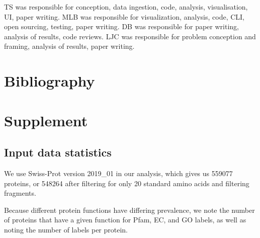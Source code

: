 \begin{contributions}
  TS was responsible for conception, data ingestion, code, analysis, visualisation, UI, paper writing. MLB was
  responsible for visualization, analysis, code, CLI, open sourcing, testing, paper writing. DB was responsible for
  paper writing, analysis of results, code reviews. LJC was responsible for problem conception and framing, analysis of results, paper writing.
\end{contributions}

  
  \section*{Bibliography}


\onecolumn
\newpage

\section*{Supplement}
\beginsupplement


\subsection{Input data statistics}

We use Swiss-Prot version 2019\_01 in our analysis, which gives us 559077 proteins, or 548264 after filtering for only 20 standard amino acids and filtering fragments.

Because different protein functions have differing prevalence, we note the number of proteins that have a given function for Pfam, EC, and GO labels, as well as noting the number of labels per protein.

